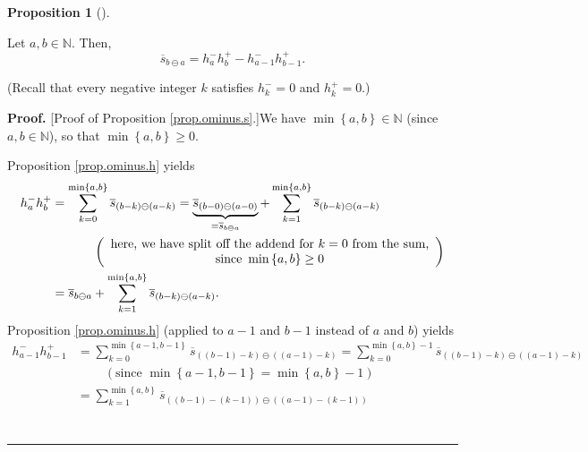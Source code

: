\documentclass[numbers=enddot,12pt,final,onecolumn,notitlepage]{scrartcl}%
\theoremstyle{definition}
\newtheorem{prop}[theo]{Proposition}
\newenvironment{proposition}[1][]
{\begin{prop}[#1]\begin{leftbar}}
{\end{leftbar}\end{prop}}
\newenvironment{proof}[1][Proof]{\noindent\textbf{#1.} }{\ \rule{0.5em}{0.5em}}
\let\sumnonlimits\sum
\renewcommand{\sum}{\sumnonlimits\limits}
\begin{document}
\begin{proposition}
\label{prop.ominus.s}Let $a,b\in\mathbb{N}$. Then,%
\[
\overline{s}_{b\ominus a}=h_{a}^{-}h_{b}^{+}-h_{a-1}^{-}h_{b-1}^{+}.
\]

\end{proposition}

(Recall that every negative integer $k$ satisfies $h_{k}^{-}=0$ and $h_{k}%
^{+}=0$.)

\begin{proof}
[Proof of Proposition \ref{prop.ominus.s}.]We have $\min\left\{  a,b\right\}
\in\mathbb{N}$ (since $a,b\in\mathbb{N}$), so that $\min\left\{  a,b\right\}
\geq0$.

Proposition \ref{prop.ominus.h} yields%
\begin{align}
h_{a}^{-}h_{b}^{+}  &  =\sum_{k=0}^{\min\left\{  a,b\right\}  }\overline
{s}_{\left(  b-k\right)  \ominus\left(  a-k\right)  }=\underbrace{\overline
{s}_{\left(  b-0\right)  \ominus\left(  a-0\right)  }}_{=\overline
{s}_{b\ominus a}}+\sum_{k=1}^{\min\left\{  a,b\right\}  }\overline{s}_{\left(
b-k\right)  \ominus\left(  a-k\right)  }\nonumber\\
&  \ \ \ \ \ \ \ \ \ \ \left(
\begin{array}
[c]{c}%
\text{here, we have split off the addend for }k=0\text{ from the sum,}\\
\text{since }\min\left\{  a,b\right\}  \geq0
\end{array}
\right) \nonumber\\
&  =\overline{s}_{b\ominus a}+\sum_{k=1}^{\min\left\{  a,b\right\}  }%
\overline{s}_{\left(  b-k\right)  \ominus\left(  a-k\right)  }.
\label{pf.prop.ominus.s.1}%
\end{align}
Proposition \ref{prop.ominus.h} (applied to $a-1$ and $b-1$ instead of $a$ and
$b$) yields%
\begin{align*}
h_{a-1}^{-}h_{b-1}^{+}  &  =\sum_{k=0}^{\min\left\{  a-1,b-1\right\}
}\overline{s}_{\left(  \left(  b-1\right)  -k\right)  \ominus\left(  \left(
a-1\right)  -k\right)  }=\sum_{k=0}^{\min\left\{  a,b\right\}  -1}\overline
{s}_{\left(  \left(  b-1\right)  -k\right)  \ominus\left(  \left(  a-1\right)
-k\right)  }\\
&  \ \ \ \ \ \ \ \ \ \ \left(  \text{since }\min\left\{  a-1,b-1\right\}
=\min\left\{  a,b\right\}  -1\right) \\
&  =\sum_{k=1}^{\min\left\{  a,b\right\}  }\overline{s}_{\left(  \left(
b-1\right)  -\left(  k-1\right)  \right)  \ominus\left(  \left(  a-1\right)
-\left(  k-1\right)  \right)  }\\

\end{align*}
\end{proof}
\end{document}
